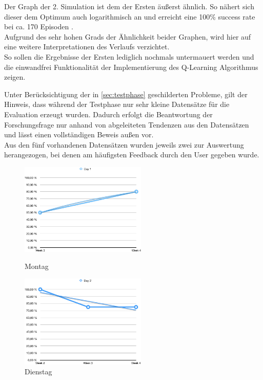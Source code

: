 Der Graph der 2. Simulation ist dem der Ersten äußerst ähnlich. So nähert sich dieser dem Optimum auch logarithmisch an und erreicht eine 100\% success rate bei ca. 170 Episoden .\\
Aufgrund des sehr hohen Grads der Ähnlichkeit beider Graphen, wird hier auf eine weitere Interpretationen des Verlaufs verzichtet. \\
So sollen die Ergebnisse der Ersten lediglich nochmals untermauert werden und die einwandfrei Funktionalität der Implementierung des Q-Learning Algorithmus zeigen. 

Unter Berücksichtigung der in \ref{sec:testphase} geschilderten Probleme, gilt der Hinweis, dass während der Testphase nur sehr kleine Datensätze für die Evaluation erzeugt wurden. Dadurch erfolgt die Beantwortung der Forschungsfrage nur anhand von abgeleiteten Tendenzen aus den Datensätzen und lässt einen vollständigen Beweis außen vor.  \\
Aus den fünf vorhandenen Datensätzen wurden jeweils zwei zur Auswertung herangezogen, bei denen am häufigsten Feedback durch den User gegeben wurde. \\


\begin{figure}[t!]
    \centering
    \parbox{6cm}{
    \includegraphics[width=6cm]{./Abbildungen/Kapitel_04/usr1day1.png}
    \caption{Montag}
    \label{usr1day1}}
    \qquad
    \begin{minipage}{6cm}
    \includegraphics[width=6cm]{./Abbildungen/Kapitel_04/usr1day2.png}
    \caption{Dienstag}
    \label{usr1day2}
    \end{minipage}
\end{figure}


